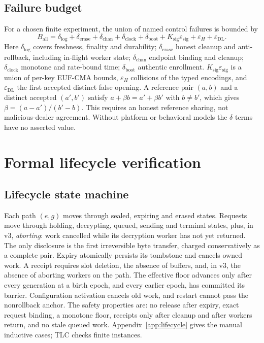 \documentclass[pdflatex,sn-mathphys-num]{sn-jnl}
\theoremstyle{plain}
\theoremstyle{definition}
\begin{document}
\subsection{Failure budget}
For a chosen finite experiment, the union of named control failures is bounded by
\begin{equation}\label{eq:budget}
 B_{\mathrm{all}}=\delta_{\mathrm{log}}+\delta_{\mathrm{erase}}+\delta_{\mathrm{chan}}+\delta_{\mathrm{clock}}+\delta_{\mathrm{boot}}+K_{\mathrm{sig}}\varepsilon_{\mathrm{sig}}+\varepsilon_H+\varepsilon_{\mathrm{DL}}.
\end{equation}
Here $\delta_{\mathrm{log}}$ covers freshness, finality and durability; $\delta_{\mathrm{erase}}$ honest cleanup and anti-rollback, including in-flight worker state; $\delta_{\mathrm{chan}}$ endpoint binding and cleanup; $\delta_{\mathrm{clock}}$ monotone and rate-bound time; $\delta_{\mathrm{boot}}$ authentic enrollment. $K_{\mathrm{sig}}\varepsilon_{\mathrm{sig}}$ is a union of per-key EUF-CMA bounds, $\varepsilon_H$ collisions of the typed encodings, and $\varepsilon_{\mathrm{DL}}$ the first accepted distinct false opening. A reference pair $(a,b)$ and a distinct accepted $(a',b')$ satisfy $a+\beta b=a'+\beta b'$ with $b\ne b'$, which gives $\beta=(a-a')/(b'-b)$. This requires an honest reference sharing, not malicious-dealer agreement. Without platform or behavioral models the $\delta$ terms have no asserted value.


\section{Formal lifecycle verification}\label{sec:formal}

\subsection{Lifecycle state machine}
Each path $(e,g)$ moves through sealed, expiring and erased states. Requests move through holding, decrypting, queued, sending and terminal states, plus, in v3, \emph{aborting}: work cancelled while its decryption worker has not yet returned. The only disclosure is the first irreversible byte transfer, charged conservatively as a complete pair. Expiry atomically persists its tombstone and cancels owned work. A receipt requires slot deletion, the absence of buffers, and, in v3, the absence of aborting workers on the path. The effective floor advances only after every generation at a birth epoch, and every earlier epoch, has committed its barrier. Configuration activation cancels old work, and restart cannot pass the nonrollback anchor. The safety properties are: no release after expiry, exact request binding, a monotone floor, receipts only after cleanup and after workers return, and no stale queued work. Appendix~\ref{app:lifecycle} gives the manual inductive cases; TLC checks finite instances.
\end{document}

